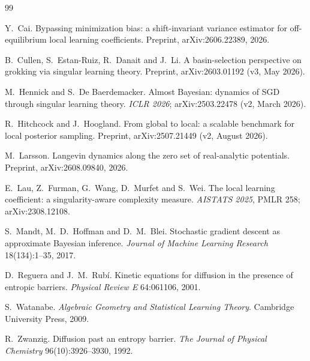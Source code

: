 \documentclass[11pt,a4paper]{article}
\begin{document}
\begin{thebibliography}{99}\small\raggedright
\setlength{\itemsep}{3pt}

 Y.~Cai. Bypassing minimization bias: a shift-invariant
variance estimator for off-equilibrium local learning coefficients.
Preprint, arXiv:2606.22389, 2026.

 B.~Cullen, S.~Estan-Ruiz, R.~Danait and J.~Li. A
basin-selection perspective on grokking via singular learning theory.
Preprint, arXiv:2603.01192 (v3, May 2026).

 M.~Hennick and S.~De Baerdemacker. Almost Bayesian: dynamics of SGD through singular learning theory. \emph{ICLR 2026};
arXiv:2503.22478 (v2, March 2026).

 R.~Hitchcock and J.~Hoogland. From global to local:
a scalable benchmark for local posterior sampling. Preprint,
arXiv:2507.21449 (v2, August 2026).

 M.~Larsson. Langevin dynamics along the zero set of
real-analytic potentials. Preprint, arXiv:2608.09840, 2026.

 E.~Lau, Z.~Furman, G.~Wang, D.~Murfet and S.~Wei. The
local learning coefficient: a singularity-aware complexity measure.
\emph{AISTATS 2025}, PMLR 258; arXiv:2308.12108.

 S.~Mandt, M.~D.~Hoffman and D.~M.~Blei. Stochastic
gradient descent as approximate Bayesian inference. \emph{Journal of
Machine Learning Research} 18(134):1--35, 2017.

 D.~Reguera and J.~M.~Rub\'i. Kinetic equations for
diffusion in the presence of entropic barriers. \emph{Physical Review E}
64:061106, 2001.

 S.~Watanabe. \emph{Algebraic Geometry and
Statistical Learning Theory}. Cambridge University Press, 2009.

 R.~Zwanzig. Diffusion past an entropy barrier.
\emph{The Journal of Physical Chemistry} 96(10):3926--3930, 1992.

\end{thebibliography}
\end{document}
